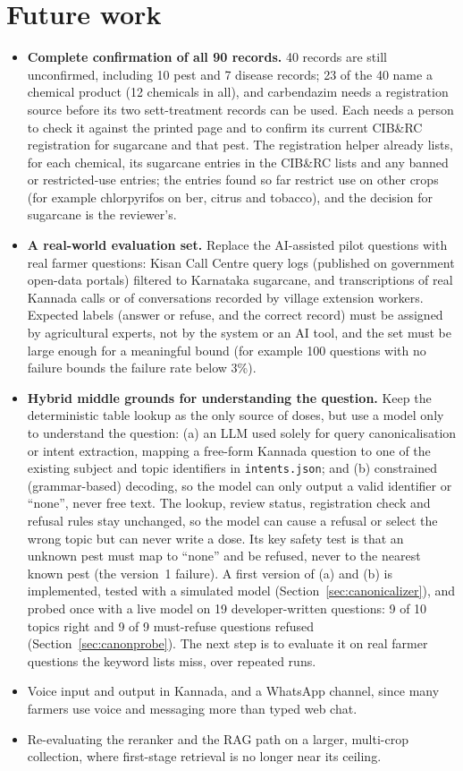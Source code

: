 \section{Future work}
\begin{itemize}
  \item \textbf{Complete confirmation of all 90 records.} 40 records are still unconfirmed,
    including 10 pest and 7 disease records; 23 of the 40 name a chemical product
    (12 chemicals in all), and carbendazim needs a registration source before its two
    sett-treatment records can be used. Each needs a person to check it against the printed page and to
    confirm its current CIB\&RC registration for sugarcane and that pest. The registration
    helper already lists, for each chemical, its sugarcane entries in the CIB\&RC lists and
    any banned or restricted-use entries; the entries found so far restrict use on other
    crops (for example chlorpyrifos on ber, citrus and tobacco), and the decision for
    sugarcane is the reviewer's.
  \item \textbf{A real-world evaluation set.} Replace the AI-assisted pilot questions with real
    farmer questions: Kisan Call Centre query logs (published on government open-data
    portals) filtered to Karnataka sugarcane, and transcriptions of real Kannada calls or of
    conversations recorded by village extension workers. Expected labels (answer or refuse,
    and the correct record) must be assigned by agricultural experts, not by the system or
    an AI tool, and the set must be large enough for a meaningful bound (for example 100
    questions with no failure bounds the failure rate below 3\%).
  \item \textbf{Hybrid middle grounds for understanding the question.} Keep the deterministic
    table lookup as the only source of doses, but use a model only to understand the
    question: (a) an LLM used solely for query canonicalisation or intent extraction, mapping
    a free-form Kannada question to one of the existing subject and topic identifiers in
    \texttt{intents.json}; and (b) constrained (grammar-based) decoding, so the model can only
    output a valid identifier or ``none'', never free text. The lookup, review status,
    registration check and refusal rules stay unchanged, so the model can cause a refusal or
    select the wrong topic but can never write a dose. Its key safety test is that an
    unknown pest must map to ``none'' and be refused, never to the nearest known pest (the
    version~1 failure). A first version of (a) and (b) is implemented, tested with a
    simulated model (Section~\ref{sec:canonicalizer}), and probed once with a live model on 19
    developer-written questions: 9 of 10 topics right and 9 of 9 must-refuse questions refused
    (Section~\ref{sec:canonprobe}). The next step is to evaluate it on real farmer questions
    the keyword lists miss, over repeated runs.
  \item Voice input and output in Kannada, and a WhatsApp channel, since many farmers use
    voice and messaging more than typed web chat.
  \item Re-evaluating the reranker and the RAG path on a larger, multi-crop collection, where
    first-stage retrieval is no longer near its ceiling.
\end{itemize}

